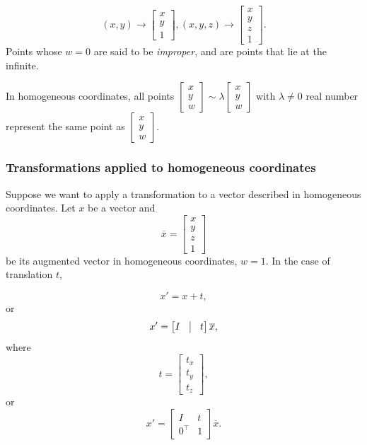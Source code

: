 \documentclass[10pt]{report}
\begin{document}
\[(x, y) \rightarrow \begin{bmatrix} x \\ y \\ 1\end{bmatrix}, (x, y, z) \rightarrow \begin{bmatrix} x \\ y \\ z \\ 1\end{bmatrix}.\] Points whose \(w = 0\) are said to be \emph{improper}, and are points that lie at the infinite.

In homogeneous coordinates, all points
\(\begin{bmatrix}x \\ y \\ w\end{bmatrix} \sim \lambda \begin{bmatrix} x \\ y \\ w\end{bmatrix}\) with
\(\lambda \neq 0\) real number represent the same point as
\(\begin{bmatrix} x \\ y \\ w\end{bmatrix}\).

\subsubsection{Transformations applied to homogeneous coordinates}
\label{sec:orgacd29de}
Suppose we want to apply a transformation to a vector described in
homogeneous coordinates. Let \(x\) be a vector and
\[\overline{x} = \begin{bmatrix} x\\ y\\ z\\ 1\end{bmatrix}\] be its
augmented vector in homogeneous coordinates, \(w=1\). In the case of translation
\(t\),

\[x' = x + t,\] or \[x' =\begin{bmatrix} I & \vline & t\end{bmatrix} \overline{x},\] where
\[t = \begin{bmatrix} t_x\\ t_y \\ t_z\end{bmatrix},\] or
\[x' = \begin{bmatrix} I & t \\ 0^\top & 1\end{bmatrix}\overline{x}.\]
\end{document}
